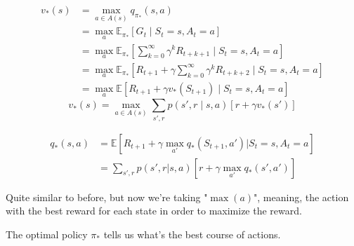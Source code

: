 \begin{align*}
v_*(s) &= \max_{a \in {A}(s)} q_{\pi_*}(s, a) \\
    &= \max_a \mathbb{E}_{\pi_*} [G_t \mid S_t = s, A_t = a] \\
    &= \max_a \mathbb{E}_{\pi_*} \left[ \sum_{k=0}^{\infty} \gamma^k R_{t+k+1} \mid S_t = s, A_t = a \right] \\
    &= \max_a \mathbb{E}_{\pi_*} \left[ R_{t+1} + \gamma \sum_{k=0}^{\infty} \gamma^k R_{t+k+2} \mid S_t = s, A_t = a \right] \\
    &= \max_a \mathbb{E} [R_{t+1} + \gamma v_*(S_{t+1}) \mid S_t = s, A_t = a]
\end{align*}
\[
    v_*(s) = \max_{a \in {A}(s)} \sum_{s',r} p(s', r \mid s, a) \left[ r + \gamma v_*(s') \right]
\]

\begin{align*}
    q_*(s,a) &= \mathbb{E}[R_{t+1} + \gamma \max_{a'} q_*(S_{t+1},a') | S_t=s,A_t=a] \\
    &= \sum_{s',r} p(s',r | s,a) \left[ r + \gamma \max_{a'} q_*(s',a') \right]
\end{align*}

Quite similar to before, but now we’re taking "$\max(a)$", meaning, the action with the best reward for each state in order to maximize the reward.

The optimal policy $\pi_*$ tells us what’s the best course of actions.






















































